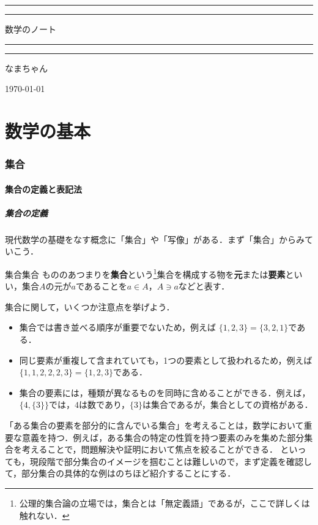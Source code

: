\documentclass[a4paper,11pt]{ltjsarticle}
\renewcommand{\emph}[1]{\textbf{#1}}
\newcommand{\tituloum}[5]{
  \begin{titlepage}
    \begin{center}
        \pagecolor{white} %
        \color{mypurple} %
        
        \vspace*{2\baselineskip}
        
        \textcolor{mypurple}{\rule{\textwidth}{1.6pt}}\vspace*{-\baselineskip}\vspace*{2pt}
        \textcolor{mypurple}{\rule{\textwidth}{0.4pt}}
        
        \vspace{0.75\baselineskip}
        
        {\huge #1}
        
        \vspace{0.75\baselineskip}
        
        \textcolor{mypurple}{\rule{\textwidth}{0.4pt}}\vspace*{-\baselineskip}\vspace{3.2pt}
        \textcolor{mypurple}{\rule{\textwidth}{1.6pt}}
        
        \vspace{2\baselineskip}
        
        #3
        
        \vspace*{3\baselineskip}
        
        {\huge #2}
        
        \vspace{0.5\baselineskip}
        
        \textit{#4}
        
        \vfill
        
        \vspace{0.3\baselineskip}
        
        #5
        
    \end{center}
\end{titlepage}%
}
\begin{document}
\tituloum{数学のノート}{なまちゃん}{}{}{\today}

%

\thispagestyle{empty}

\newpage
{}
\pagecolor{white}

\localtableofcontents
\newpage 

\part{数学の基本}
\section{集合}
  \subsection{集合の定義と表記法}

  \subsubsection{集合の定義}

  現代数学の基礎をなす概念に「集合」や「写像」がある．まず「集合」からみていこう．
  \begin{definition}{集合}{集合}
      もののあつまりを\emph{集合}という\footnote{公理的集合論の立場では，集合とは「無定義語」であるが，ここで詳しくは触れない．}集合を構成する物を\emph{元}または\emph{要素}といい，集合$A$の元が$a$であることを$a \in A$，$A \ni a$などと表す．
  \end{definition}
  
  集合に関して，いくつか注意点を挙げよう．
  
  \begin{itemize}
      \item 集合では書き並べる順序が重要でないため，例えば $\{1, 2, 3\} = \{3, 2, 1\}$である．
      \item 同じ要素が重複して含まれていても，1つの要素として扱われるため，例えば$\{1, 1, 2, 2, 2, 3\} = \{1, 2, 3\}$である．
      \item 集合の要素には，種類が異なるものを同時に含めることができる．例えば，$\{4, \{3\}\}$では，$4$は数であり，$\{3\}$は集合であるが，集合としての資格がある．
  \end{itemize}

  「ある集合の要素を部分的に含んでいる集合」を考えることは，数学において重要な意義を持つ．例えば，ある集合の特定の性質を持つ要素のみを集めた部分集合を考えることで，問題解決や証明において焦点を絞ることができる．
  といっても，現段階で部分集合のイメージを掴むことは難しいので，まず定義を確認して，部分集合の具体的な例はのちほど紹介することにする．
  
\end{document}
